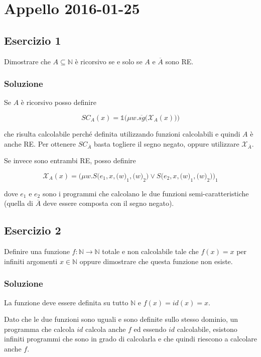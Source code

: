 \section{Appello 2016-01-25}

\subsection{Esercizio 1}

Dimostrare che $A \subseteq \mathbb{N}$ è ricorsivo se e solo se $A$ e $\overline{A}$ sono RE.

\subsubsection{Soluzione}

Se $A$ è ricorsivo posso definire 

$$
SC_A(x) = \mathbb{1}\Big( \mu w . \overline{sg}\big(\mathcal{X}_A(x)\big)\Big)
$$

che risulta calcolabile perché definita utilizzando funzioni calcolabili e quindi $A$ è anche RE. Per ottenere $SC_{\overline{A}}$ basta togliere il segno negato, oppure utilizzare $\mathcal{X}_{\overline{A}}$.

Se invece sono entrambi RE, posso definire 

$$
\mathcal{X}_A(x) = \bigg( \mu w . S\Big(e_1, x, \big(w\big)_1, \big(w\big)_2\Big) \vee S\Big(e_2, x, \big(w\big)_1,\big(w\big)_2\Big) \bigg)_1
$$

dove $e_1$ e $e_2$ sono i programmi che calcolano le due funzioni semi-caratteristiche (quella di $\overline{A}$ deve essere composta con il segno negato).

\subsection{Esercizio 2}

Definire una funzione $f : \mathbb{N} \rightarrow \mathbb{N}$ totale e non calcolabile tale che $f(x) = x$ per infiniti argomenti $x \in \mathbb{N}$ oppure dimostrare che questa funzione non esiste.

\subsubsection{Soluzione}

La funzione deve essere definita su tutto $\mathbb{N}$ e $f(x) = id(x) = x$.

Dato che le due funzioni sono uguali e sono definite sullo stesso dominio, un programma che calcola $id$ calcola anche $f$ ed essendo $id$ calcolabile, esistono infiniti programmi che sono in grado di calcolarla e che quindi riescono a calcolare anche $f$.

